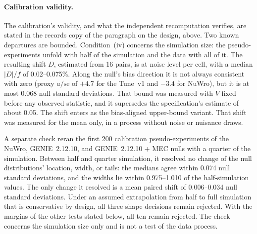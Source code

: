 \paragraph{Calibration validity.} The calibration's validity, and what the independent recomputation verifies, are stated in the records copy of the paragraph on the design, above. Two known departures are bounded. Condition~(iv) concerns the simulation size: the pseudo-experiments unfold with half of the simulation and the data with all of it. The resulting shift $D$, estimated from 16 pairs, is at noise level per cell, with a median $|D|/f$ of 0.02--0.075\%. Along the null's bias direction it is not always consistent with zero (proxy $a/\mathrm{se}$ of $+4.7$ for the Tune~v1 and $-3.4$ for NuWro), but it is at most 0.068 null standard deviations. That bound was measured with $V$ fixed before any observed statistic, and it supersedes the specification's estimate of about 0.05. The shift enters as the bias-aligned upper-bound variant. That shift was measured for the mean only, in a process without noise or nuisance draws.

A separate check reran the first 200 calibration pseudo-experiments of the NuWro, GENIE~2.12.10, and GENIE~2.12.10 + MEC nulls with a quarter of the simulation. Between half and quarter simulation, it resolved no change of the null distributions' location, width, or tails: the medians agree within 0.074 null standard deviations, and the widths lie within 0.975--1.010 of the half-simulation values. The only change it resolved is a mean paired shift of 0.006--0.034 null standard deviations. Under an assumed extrapolation from half to full simulation that is conservative by design, all three shape decisions remain rejected. With the margins of the other tests stated below, all ten remain rejected. The check concerns the simulation size only and is not a test of the data process.

